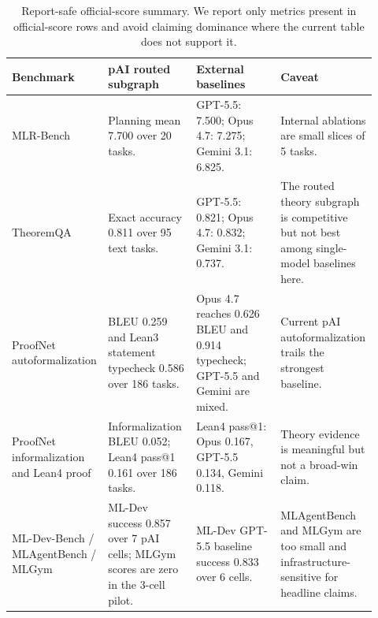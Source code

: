 \documentclass{article}
\begin{document}
\begin{table}[h]
\centering
\caption{Report-safe official-score summary. We report only metrics present in official-score rows and avoid claiming dominance where the current table does not support it.}
\label{tab:benchmark_scores}
\small
\setlength{\tabcolsep}{3pt}
\begin{tabular}{@{}p{0.22\linewidth}p{0.24\linewidth}p{0.23\linewidth}p{0.23\linewidth}@{}}
\toprule
\textbf{Benchmark} & \textbf{pAI routed subgraph} & \textbf{External baselines} & \textbf{Caveat} \\
\midrule
MLR-Bench & Planning mean 7.700 over 20 tasks. & GPT-5.5: 7.500; Opus 4.7: 7.275; Gemini 3.1: 6.825. & Internal ablations are small slices of 5 tasks. \\
TheoremQA & Exact accuracy 0.811 over 95 text tasks. & GPT-5.5: 0.821; Opus 4.7: 0.832; Gemini 3.1: 0.737. & The routed theory subgraph is competitive but not best among single-model baselines here. \\
ProofNet autoformalization & BLEU 0.259 and Lean3 statement typecheck 0.586 over 186 tasks. & Opus 4.7 reaches 0.626 BLEU and 0.914 typecheck; GPT-5.5 and Gemini are mixed. & Current pAI autoformalization trails the strongest baseline. \\
ProofNet informalization and Lean4 proof & Informalization BLEU 0.052; Lean4 pass@1 0.161 over 186 tasks. & Lean4 pass@1: Opus 0.167, GPT-5.5 0.134, Gemini 0.118. & Theory evidence is meaningful but not a broad-win claim. \\
ML-Dev-Bench / MLAgentBench / MLGym & ML-Dev success 0.857 over 7 pAI cells; MLGym scores are zero in the 3-cell pilot. & ML-Dev GPT-5.5 baseline success 0.833 over 6 cells. & MLAgentBench and MLGym are too small and infrastructure-sensitive for headline claims. \\
\bottomrule
\end{tabular}
\end{table}
\end{document}
